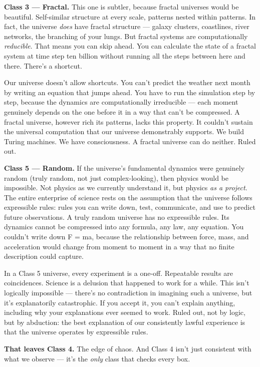 \documentclass[11pt, twoside, openright]{book}
\begin{document}
\textbf{Class 3 --- Fractal.} This one is subtler, because fractal universes would be beautiful. Self-similar structure at every scale, patterns nested within patterns. In fact, the universe \textit{does} have fractal structure --- galaxy clusters, coastlines, river networks, the branching of your lungs. But fractal systems are computationally \textit{reducible}. That means you can skip ahead. You can calculate the state of a fractal system at time step ten billion without running all the steps between here and there. There's a shortcut.

Our universe doesn't allow shortcuts. You can't predict the weather next month by writing an equation that jumps ahead. You have to run the simulation step by step, because the dynamics are computationally irreducible --- each moment genuinely depends on the one before it in a way that can't be compressed. A fractal universe, however rich its patterns, lacks this property. It couldn't sustain the universal computation that our universe demonstrably supports. We build Turing machines. We have consciousness. A fractal universe can do neither. Ruled out.

\textbf{Class 5 --- Random.} If the universe's fundamental dynamics were genuinely random (truly random, not just complex-looking), then physics would be impossible. Not physics as we currently understand it, but physics \textit{as a project}. The entire enterprise of science rests on the assumption that the universe follows expressible rules: rules you can write down, test, communicate, and use to predict future observations. A truly random universe has no expressible rules. Its dynamics cannot be compressed into any formula, any law, any equation. You couldn't write down F = ma, because the relationship between force, mass, and acceleration would change from moment to moment in a way that no finite description could capture.

In a Class 5 universe, every experiment is a one-off. Repeatable results are coincidences. Science is a delusion that happened to work for a while. This isn't logically impossible --- there's no contradiction in imagining such a universe, but it's explanatorily catastrophic. If you accept it, you can't explain anything, including why your explanations ever seemed to work. Ruled out, not by logic, but by abduction: the best explanation of our consistently lawful experience is that the universe operates by expressible rules.

\textbf{That leaves Class 4.} The edge of chaos. And Class 4 isn't just consistent with what we observe --- it's the \textit{only} class that checks every box.
\end{document}
